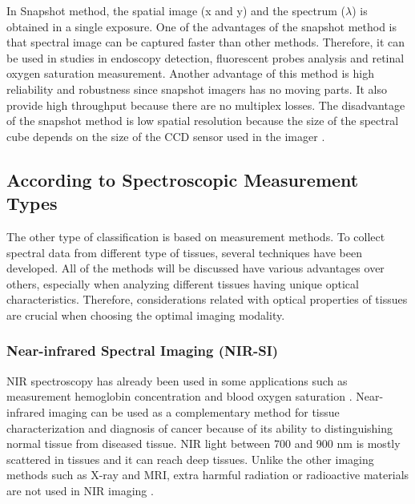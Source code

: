 \documentclass[a4paper]{article}
\begin{document}
	\medskip   
	 \hspace{5mm} In Snapshot method, the spatial image (x and y) and the spectrum ($\lambda$) is obtained in a single exposure. One of the advantages of the snapshot method is that spectral image can be captured faster than other methods. Therefore, it can be used in studies in endoscopy detection, fluorescent probes analysis and retinal oxygen saturation measurement. Another advantage of this method is high reliability and robustness since snapshot imagers has no moving parts. It also provide high throughput because there are no multiplex losses. The disadvantage of the snapshot method is low spatial resolution because the size of the spectral cube depends on the size of the CCD sensor used in the imager \cite{alti}.




    \subsection{According to Spectroscopic Measurement Types} %
    \label{sub:According_to_Spectroscopic_Measurement_Types}
			
            \medskip
            \hspace{5mm}The other type of classification is based on measurement methods. To collect spectral data from different type of tissues, several techniques have been developed. All of the methods will be discussed have various advantages over others, especially when analyzing different tissues having unique optical characteristics. Therefore, considerations related with optical properties of tissues are crucial when choosing the optimal imaging modality. 
            
            \medskip
           \subsubsection{Near-infrared Spectral Imaging (NIR-SI)}
           \hspace{5mm} NIR spectroscopy has already been used in some applications such as measurement hemoglobin concentration and blood oxygen saturation \cite{onuc}. Near-infrared imaging can be used as a complementary method for tissue characterization and diagnosis of cancer because of its ability to distinguishing normal tissue from diseased tissue. NIR light between 700 and 900 nm is mostly scattered in tissues and it can reach deep tissues. Unlike the other imaging methods such as X-ray and MRI, extra harmful radiation or radioactive materials are not used in NIR imaging \cite{ondort}. 
\end{document}
